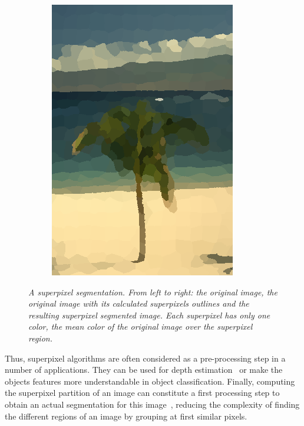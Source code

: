\documentclass{article}
\begin{document}
\begin{figure}[!ht]
\begin{subfigure}{.3\linewidth}
            \includegraphics[width=0.9\linewidth]{pics/img_spp3.png}
        \end{subfigure}
            \caption{\textit{A superpixel segmentation. From left to right: the original image, the original image with its calculated superpixels outlines and the resulting superpixel segmented image. Each superpixel has only one color, the mean color of the original image over the superpixel region.}}
            \label{fig:spp}
        \end{figure}

        Thus, superpixel algorithms are often considered as a pre-processing step in a number of applications. They can be used for depth estimation~\cite{zitnick_2007} or make the objects features more understandable in object classification. Finally, computing the superpixel partition of an image can constitute a first processing step to obtain an actual segmentation for this image~\cite{fulkerson_2009}, reducing the complexity of finding the different regions of an image by grouping at first similar pixels.
\end{document}
